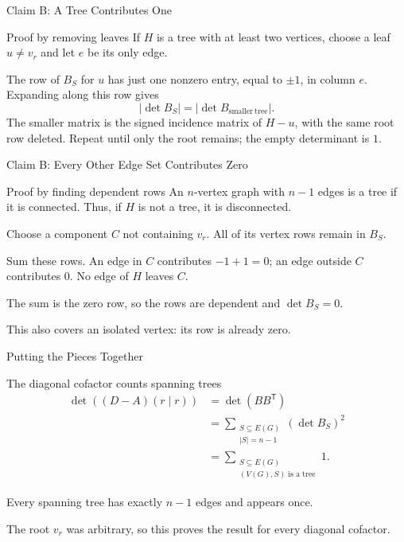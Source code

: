 \documentclass[aspectratio=169,11pt]{beamer}
\begin{document}
\begin{frame}[t]{Claim B: A Tree Contributes One}
\begin{block}{Proof by removing leaves}
If $H$ is a tree with at least two vertices, choose a leaf $u\ne v_r$ and let $e$ be its only edge.
\par\medskip
The row of $B_S$ for $u$ has just one nonzero entry, equal to $\pm1$, in column $e$. Expanding along this row gives
\[
|\det B_S|=|\det B_{\mathrm{smaller\ tree}}|.
\]
The smaller matrix is the signed incidence matrix of $H-u$, with the same root row deleted. Repeat until only the root remains; the empty determinant is $1$.
\end{block}
\begin{center}
\end{center}
\end{frame}

\begin{frame}[t]{Claim B: Every Other Edge Set Contributes Zero}
\begin{block}{Proof by finding dependent rows}
An $n$-vertex graph with $n-1$ edges is a tree if it is connected. Thus, if $H$ is not a tree, it is disconnected.
\par\medskip
Choose a component $C$ not containing $v_r$. All of its vertex rows remain in $B_S$.
\par\medskip
Sum these rows. An edge in $C$ contributes $-1+1=0$; an edge outside $C$ contributes $0$. No edge of $H$ leaves $C$.
\par\medskip
The sum is the zero row, so the rows are dependent and $\det B_S=0$.
\end{block}
\medskip
This also covers an isolated vertex: its row is already zero.
\end{frame}

\begin{frame}[t]{Putting the Pieces Together}
\begin{block}{The diagonal cofactor counts spanning trees}
\begin{align*}
\det((D-A)(r\mid r))
&=\det(BB^{\mathsf T})\\[.4em]
&=\sum_{\substack{S\subseteq E(G)\\|S|=n-1}}(\det B_S)^2\\[.4em]
&=\sum_{\substack{S\subseteq E(G)\\(V(G),S)\text{ is a tree}}}1.
\end{align*}
\end{block}
Every spanning tree has exactly $n-1$ edges and appears once.
\par\medskip
The root $v_r$ was arbitrary, so this proves the result for every diagonal cofactor.
\end{frame}
\end{document}
